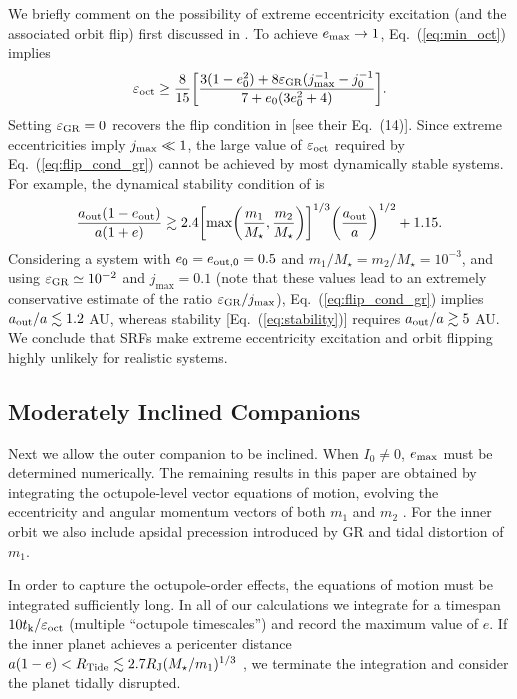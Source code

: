 \documentclass[12pt,useAMS, usenatbib]{mn2e}
\newcommand{\be}{\begin{equation}}
\newcommand{\ee}{\end{equation}}
\newcommand{\Max}{{\rm max}}
\newcommand{\Out}{{\rm out}}
\newcommand{\oct}{{\rm oct}}
\newcommand{\aout}{a_\Out}
\newcommand{\eout}{e_\Out}
\newcommand{\emax}{e_\Max}
\newcommand{\tide}{\rm Tide}
\newcommand{\rtide}{R_{\tide}}
\newcommand{\gr}{\rm GR}
\newcommand{\tk}{t_{\rm k}}
\newcommand{\rjup}{R_{\rm J}}
\begin{document}
We briefly comment on the possibility of extreme eccentricity excitation (and the associated orbit flip) first discussed in \cite{li2014}.
To achieve $\emax \to 1$, Eq.~(\ref{eq:min_oct}) implies
\be
\varepsilon_\oct \geq \frac{8}{15} \bigg[\frac{3(1 - e_0^2) + 8 \varepsilon_{\gr} ( j_\Max^{-1} - j_0^{-1}}{7 + e_0(3 e_0^2 + 4) } \bigg].
\label{eq:flip_cond_gr}
\ee
Setting $\varepsilon_{\gr}=0$ recovers the flip condition in \cite{li2014} [see their Eq.~(14)].  Since extreme eccentricities imply $j_{\Max} \ll 1$, the large value of $\varepsilon_{\oct} $ required by Eq.~(\ref{eq:flip_cond_gr}) cannot be achieved by most dynamically stable systems.  For example, the dynamical stability condition of \cite{petrovich2015c} is
\be
\frac{\aout (1 - \eout)}{a (1 + e)} \gtrsim 2.4 \bigg[ {\rm max} \bigg (\frac{m_1}{M_\star}, \frac{m_2}{M_\star} \bigg) \bigg]^{1/3} \bigg(\frac{\aout}{a} \bigg)^{1/2} + 1.15.
\label{eq:stability}
\ee
Considering a system with $e_0 = e_{\Out,0}  = 0.5$ and $m_1/M_\star = m_2/M_\star = 10^{-3}$, and using $\varepsilon_{\gr} \simeq 10^{-2}$ and $j_{\max} = 0.1$ (note that these values lead to an extremely conservative estimate of the ratio $\varepsilon_{\gr}/j_{\Max}$), Eq.~(\ref{eq:flip_cond_gr}) implies $\aout/a \lesssim 1.2$ AU, whereas stability [Eq.~(\ref{eq:stability})] requires $\aout / a \gtrsim 5$ AU. We conclude that SRFs make extreme eccentricity excitation and orbit flipping highly unlikely for realistic systems.  


\subsection{Moderately Inclined Companions}
\label{sec:mediuminc}
Next we allow the outer companion to be inclined.  When $I_0 \neq 0$, $\emax$ must be determined numerically.  The remaining results in this paper are obtained by integrating the octupole-level vector equations of motion, evolving the eccentricity and angular momentum vectors of both $m_1$ and $m_2$ \citep[e.g.][]{liu2015}. For the inner orbit we also include apsidal precession introduced by GR and tidal distortion of $m_1$.

In order to capture the octupole-order effects, the equations of motion must be integrated sufficiently long.  In all of our calculations we integrate for a timespan $10 \tk/\varepsilon_{\oct}$ (multiple ``octupole timescales'') and record the maximum value of $e$.  If the inner planet achieves a pericenter distance $a(1 - e) < \rtide \lesssim 2.7 \rjup (M_\star / m_1)^{1/3}$ \citep[e.g.][]{guillochon2011}, we terminate the integration and consider the planet tidally disrupted. 
\end{document}
